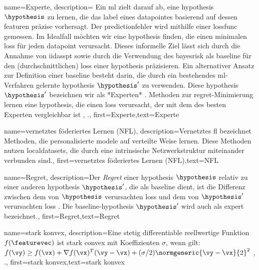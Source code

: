 {{{
{name={Experte},
	description={ Ein \gls{ml} zielt darauf ab, eine \gls{hypothesis} $\hypothesis$ zu 			 lernen, die das \gls{label} eines \gls{datapointes} basierend auf dessen \gls{feature}n präzise vorhersagt. 
		Der \gls{prediction}fehler wird mithilfe einer \gls{lossfunc} gemessen. 
		Im Idealfall möchten wir eine \gls{hypothesis} finden, die einen minimalen \gls{loss} 
		für jeden \gls{datapoint} verursacht. Dieses informelle Ziel lässt sich durch die Annahme 
		von \gls{iidasspt} sowie durch die Verwendung des \gls{bayesrisk} als \gls{baseline} für den (durchschnittlichen) 
		\gls{loss} einer \gls{hypothesis} präzisieren. Ein alternativer Ansatz zur Definition einer \gls{baseline} 
		besteht darin, die durch ein bestehendes \gls{ml}-Verfahren gelernte \gls{hypothesis} $\hypothesis'$ zu verwenden. 
		Diese \gls{hypothesis} $\hypothesis'$ bezeichnen wir als *Experten* \cite{PredictionLearningGames}. 
		Methoden zur \gls{regret}-Minimierung lernen eine \gls{hypothesis}, 
		die einen \gls{loss} verursacht, der mit dem des besten Experten vergleichbar ist 
		\cite{PredictionLearningGames}, \cite{HazanOCO}.},
	first={Experte},text={Experte} 
}

{name={vernetztes föderiertes Lernen (NFL)},
	description={Vernetztes \gls{fl} bezeichnet Methoden, 
		die personalisierte \gls{model}e auf verteilte Weise lernen. 
		Diese Methoden nutzen \gls{localdataset}s, die durch eine intrinsische Netzwerkstruktur miteinander verbunden sind.},
	first={vernetztes föderiertes Lernen (NFL)},text={NFL}
}

{name={Regret},
	description={Der \textit{Regret} einer \gls{hypothesis} $\hypothesis$ relativ zu 
		einer anderen \gls{hypothesis} $\hypothesis'$, die als \gls{baseline} dient, 
		ist die Differenz zwischen dem von $\hypothesis$ verursachten \gls{loss} 
		und dem von $\hypothesis'$ verursachten \gls{loss} \cite{PredictionLearningGames}. 
		Die \gls{baseline}-\gls{hypothesis} $\hypothesis'$ wird auch als \gls{expert} bezeichnet.},
	first={Regret},text={Regret}
	
	{name={stark konvex},
		description={Eine stetig \gls{differentiable} reellwertige Funktion $f(\featurevec)$ ist 
			stark \gls{convex} mit Koeffizienten $\sigma$, wenn gilt: 
			$f(\vy) \geq f(\vx) + \nabla f(\vx)^{T} (\vy - \vx) + (\sigma/2) \normgeneric{\vy - \vx}{2}^{2}$ 
			\cite{nesterov04}, \cite[Abschnitt B.1.1]{CvxAlgBertsekas}.},
		first={stark konvex},text={stark konvex} 
	}
	
}}}}
